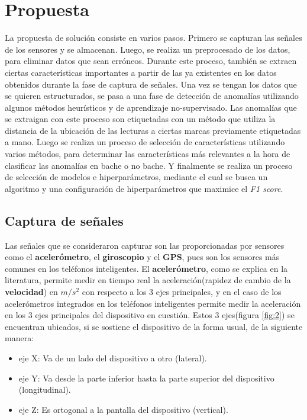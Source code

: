 \chapter{Propuesta}\label{chapter:proposal}
	La propuesta de solución consiste en varios pasos. Primero se capturan las señales de los sensores y se almacenan.
	Luego, se realiza un preprocesado de los datos, para eliminar datos que sean erróneos. Durante este proceso, también
	se extraen ciertas características importantes a partir de las ya existentes en los datos obtenidos durante la fase
	de captura de señales. Una vez se tengan los datos que se quieren estructurados, se pasa a una fase de detección de
	anomalías utilizando algunos métodos heurísticos y de aprendizaje no-supervisado. Las anomalías que se extraigan con
	este proceso son etiquetadas con un método que utiliza la distancia de la ubicación de las lecturas a ciertas marcas
	previamente etiquetadas a mano. Luego se realiza un proceso de selección de características utilizando varios métodos, 
	para determinar las características más relevantes a la hora de clasificar las anomalías en bache o no bache. Y
	finalmente se realiza un proceso de selección de modelos e hiperparámetros, mediante el cual se busca un algoritmo
	y una configuración de hiperparámetros que maximice el \emph{F1 score}.

\section{Captura de señales}
	Las señales que se consideraron capturar son las proporcionadas por sensores como el \textbf{acelerómetro},
	el \textbf{giroscopio} y el \textbf{GPS}, pues son los sensores más comunes en los teléfonos inteligentes. El
	\textbf{acelerómetro}, como se explica en la literatura, permite medir en tiempo real la aceleración(rapidez de
	cambio de la \textbf{velocidad}) en $m/s^2$ con respecto a los 3 ejes principales, y en el caso de los
	acelerómetros integrados en los teléfonos inteligentes permite medir la aceleración en los 3 ejes
	principales del dispositivo en cuestión. Estos 3 ejes(figura \ref{fig:2}) se encuentran ubicados, si se sostiene el
	dispositivo de la forma usual, de la siguiente manera:

	\begin{itemize}
		\item eje X: Va de un lado del dispositivo a otro (lateral).
		\item eje Y: Va desde la parte inferior hasta la parte superior del dispositivo (longitudinal).
		\item eje Z: Es ortogonal a la pantalla del dispositivo (vertical).
	\end{itemize}
	
